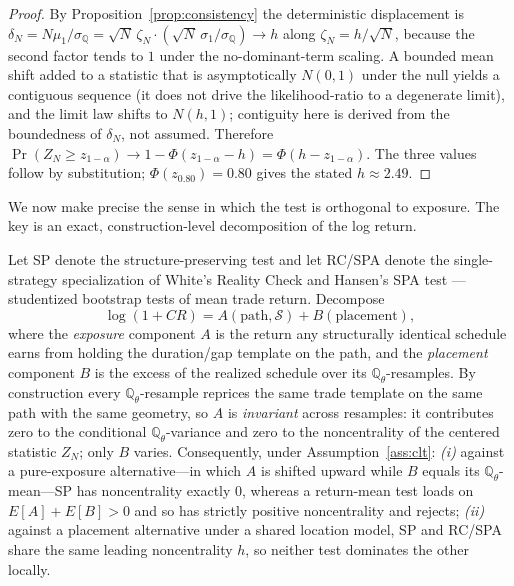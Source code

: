 \begin{proof}
By Proposition~\ref{prop:consistency} the deterministic displacement is
$\delta_N=N\mu_1/\sigma_{\mathbb Q}=\sqrt N\,\zeta_N\cdot(\sqrt N\,\sigma_1/
\sigma_{\mathbb Q})\to h$ along $\zeta_N=h/\sqrt N$, because the second factor
tends to $1$ under the no-dominant-term scaling. A bounded mean shift added to a
statistic that is asymptotically $N(0,1)$ under the null yields a contiguous
sequence (it does not drive the likelihood-ratio to a degenerate limit), and the
limit law shifts to $N(h,1)$; contiguity here is derived from the boundedness of
$\delta_N$, not assumed. Therefore $\Pr(Z_N\ge z_{1-\alpha})\to1-\Phi(z_{1-\alpha}
-h)=\Phi(h-z_{1-\alpha})$. The three values follow by substitution;
$\Phi(z_{0.80})=0.80$ gives the stated $h\approx2.49$.
\end{proof}

We now make precise the sense in which the test is orthogonal to exposure. The
key is an exact, construction-level decomposition of the log return.

\begin{proposition}
\label{prop:orthogonality}
Let SP denote the structure-preserving test and let RC/SPA denote the
single-strategy specialization of White's Reality Check \cite{white2000} and
Hansen's SPA test \cite{hansen2005}---studentized bootstrap tests of mean trade
return. Decompose
\[
\log(1+CR)=A(\text{path},\mathcal S)+B(\text{placement}),
\]
where the \emph{exposure} component $A$ is the return any structurally identical
schedule earns from holding the duration/gap template on the path, and the
\emph{placement} component $B$ is the excess of the realized schedule over its
$\mathbb{Q}_\theta$-resamples. By construction every $\mathbb{Q}_\theta$-resample
reprices the same trade template on the same path with the same geometry, so $A$
is \emph{invariant} across resamples: it contributes zero to the conditional
$\mathbb{Q}_\theta$-variance and zero to the noncentrality of the centered
statistic $Z_N$; only $B$ varies. Consequently, under Assumption~\ref{ass:clt}:
\emph{(i)} against a pure-exposure alternative---in which $A$ is shifted upward
while $B$ equals its $\mathbb{Q}_\theta$-mean---SP has noncentrality exactly $0$,
whereas a return-mean test loads on $E[A]+E[B]>0$ and so has strictly positive
noncentrality and rejects; \emph{(ii)} against a placement alternative under a
shared location model, SP and RC/SPA share the same leading noncentrality $h$, so
neither test dominates the other locally.
\end{proposition}

